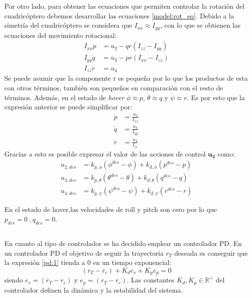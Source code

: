 Por otro lado, para obtener las ecuaciones que permiten controlar la rotación del cuadricóptero debemos desarrollar las ecuaciones \ref{model:rot_eq}. Debido a la simetría del cuadricóptero se considera que $I_{xx} \approx I_{yy}$, con lo que se obtienen las ecuaciones del movimiento rotacional:
\begin{align}
	I_ {xx} \dot p &= u_2 - qr(I_{zz}-I_{yy})\nonumber\\
	I_ {yy} \dot q &= u_3 - pr(I_{xx}-I_{zz})\label{eq:control2}\\
	I_ {zz} \dot r &= u_4\nonumber
\end{align}
Se puede asumir que la componente r es pequeña por lo que los productos de esta con otros términos, también son pequeños en comparación con el resto de términos. Además, en el estado de \textit{hover} $\dot{\phi}\approx p$, $\dot{\theta}\approx q$ y $\dot{\psi}\approx r$. Es por esto que la expresión anterior se puede simplificar por:
\begin{align}
	\dot p &= \frac{u_2}{I_ {xx}} \nonumber\\
	\dot q &= \frac{u_3}{I_ {yy}}\label{eq:control3}\\
	\dot r &= \frac{u_4}{I_ {zz}}\nonumber
\end{align}
Gracias a esto es posible expresar el valor de las acciones de control $\mathbf{u_2}$ como:
\begin{align}
	\label{eq:u2_linearized}
	u_{2,des} &= k_{p,\phi}(\phi^{des}-\phi) + k_{d,\phi}(p^{des}-p)\\
	u_{3,des} &= k_{p,\theta}(\theta^{des}-\theta) + k_{d,\theta}(q^{des}-q)\\
	u_{4,des} &= k_{p,\psi}(\psi^{des}-\psi) + k_{d,\psi}(r^{des}-r)
\end{align}

En el estado de hover,las velocidades de roll y pitch son cero por lo que $p_{des} = 0\;, q_{des} = 0$.

\subsection{}


En cuanto al tipo de controlador se ha decidido emplear un controlador PD. En un controlador PD el objetivo de seguir la trayectoria $r_T$ deseada es conseguir que la expresión \ref{pd:1} tienda a 0 en un tiempo exponencial:
\begin{equation}
	\label{pd:1}
	\left(\ddot{r_T} - \ddot{r_c}\right) + K_d e_v + K_p e_p = 0
\end{equation}
siendo $e_v = (\dot r_T - \dot r_c )$ y $e_p = (r_T - r_c )$. Las constantes $K_d,K_p \in \mathbb{R^+}$ del controlador definen la dinámica y la estabilidad del sistema.

